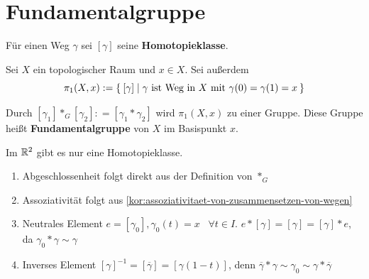 \section{Fundamentalgruppe}
Für einen Weg $\gamma$ sei $[\gamma]$ seine \textbf{Homotopieklasse}.

\begin{definition}%
    Sei $X$ ein topologischer Raum und $x \in X$. Sei außerdem
    \[\pi_1(X,x) := \Set{[\gamma] | \gamma \text{ ist Weg in } X \text{ mit } \gamma(0) = \gamma(1) = x}\]

    Durch $[\gamma_1] *_G [\gamma_2] : = [\gamma_1 * \gamma_2]$ wird
    $\pi_1(X,x)$ zu einer Gruppe. Diese Gruppe heißt \textbf{Fundamentalgruppe}
    von $X$ im Basispunkt $x$.
\end{definition}

\begin{bemerkung}
    Im $\mathbb{R}^2$ gibt es nur eine Homotopieklasse.
\end{bemerkung}

\begin{beweis}\leavevmode
    \begin{enumerate}[label=\alph*)]
        \item Abgeschlossenheit folgt direkt aus der Definition von $*_G$
        \item Assoziativität folgt aus \cref{kor:assoziativitaet-von-zusammensetzen-von-wegen}
        \item Neutrales Element $e = [\gamma_0], \gamma_0(t) = x \;\;\; \forall t \in I$.
              $e * [\gamma] = [\gamma] = [\gamma] * e$, da $\gamma_0 * \gamma \sim \gamma$
        \item Inverses Element  $[\gamma]^{-1} = [\overline{\gamma}] = [\gamma(1-t)]$, 
              denn $\overline{\gamma} * \gamma \sim \gamma_0 \sim \gamma * \overline{\gamma}$
    \end{enumerate}
\end{beweis}

